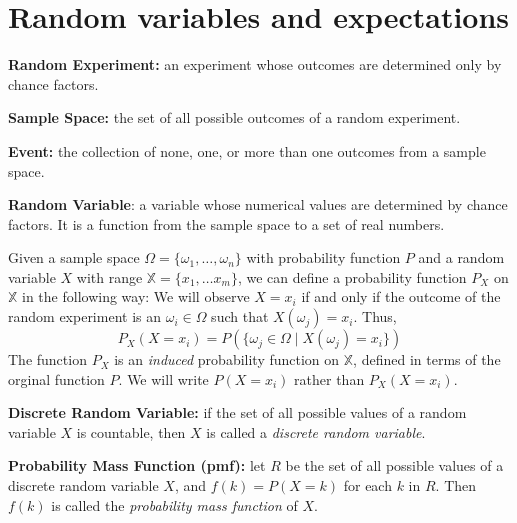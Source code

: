 \section{Random variables and expectations}

\begin{definition}
	\textbf{Random Experiment:} an experiment whose outcomes are determined only by chance factors.
\end{definition}

\begin{definition}
	\textbf{Sample Space:} the set of all possible outcomes of a random experiment.
\end{definition}

\begin{definition}
	\textbf{Event:} the collection of none, one, or more than one outcomes from a sample space.
\end{definition}

\begin{definition}
	\textbf{Random Variable}: a variable whose numerical values are determined by chance factors. It is a function from the sample space to a set of real numbers.
\end{definition}
Given a sample space $\Omega = \{ \omega_1, \ldots, \omega_n \}$ with probability function $P$ and a random variable $X$ with range $\mathbb{X} = \{ x_1, \ldots x_m \}$, we can define a probability function $P_X$ on $\mathbb{X}$ in the following way: We will observe $X = x_i$ if and only if the outcome of the random experiment is an $\omega_i \in \Omega$ such that $X(\omega_j) = x_i$. Thus,
\[
	P_X(X = x_i) = P(\{ \omega_j \in \Omega \mid X(\omega_j) = x_i \})
\]
The function $P_X$ is an \textit{induced} probability function on $\mathbb{X}$, defined in terms of the orginal function $P$. We will write $P(X = x_i)$ rather than $P_X(X = x_i)$.
\begin{definition}
	\textbf{Discrete Random Variable:} if the set of all possible values of a random variable $X$ is countable, then $X$ is called a \textit{discrete random variable}.
\end{definition}

\begin{definition}
	\textbf{Probability Mass Function (pmf):} let $R$ be the set of all possible values of a discrete random variable $X$, and $f(k) = P(X = k)$ for each $k$ in $R$. Then $f(k)$ is called the \textit{probability mass function} of $X$.
\end{definition}

